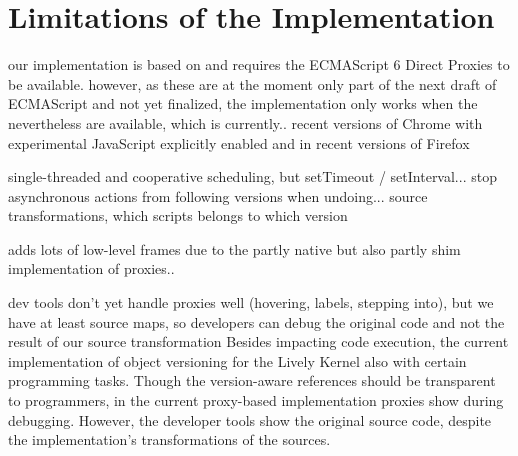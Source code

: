 \section{Limitations of the Implementation}



our implementation is based on and requires the ECMAScript 6 Direct Proxies to be available.
however, as these are at the moment only part of the next draft of ECMAScript and not yet finalized, the implementation only works when the nevertheless are available, which is currently.. recent versions of Chrome with experimental JavaScript explicitly enabled and in recent versions of Firefox



single-threaded and cooperative scheduling, but setTimeout / setInterval... stop asynchronous actions from following versions when undoing... source transformations, which scripts belongs to which version




adds lots of low-level frames due to the partly native but also partly shim implementation of proxies..

dev tools don’t yet handle proxies well (hovering, labels, stepping into), but we have at least source maps, so developers can debug the original code and not the result of our source transformation
Besides impacting code execution, the current implementation of object versioning for the Lively Kernel also with certain programming tasks.
Though the version-aware references should be transparent to programmers, in the current proxy-based implementation proxies show during debugging.
However, the developer tools show the original source code, despite the implementation's transformations of the sources.





